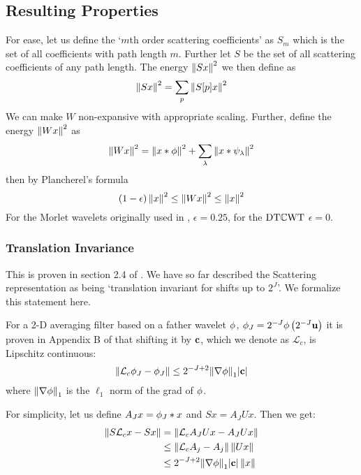 \subsection{Resulting Properties}
For ease, let us define the `$m$th order scattering coefficients' as $S_m$ which
is the set of all coefficients with path length $m$. Further let $S$ be the set
of all scattering coefficients of any path length. The energy $\left\lVert Sx \right\rVert^2$ we 
then define as
\begin{equation}
  \left\lVert Sx \right\rVert^2 = \sum_p \left\lVert S[p]x \right\rVert^2
\end{equation}
We can make $W$ non-expansive with appropriate scaling. Further, define the energy $\left\lVert Wx \right\rVert^2$ as
\begin{equation}
  \left\lVert Wx \right\rVert^2 = \left\lVert x\ast \phi \right\rVert^2 + \sum_\lambda \left\lVert x \ast
  \psi_\lambda \right\rVert^2 
\end{equation}
then by Plancherel's formula
\begin{equation}
  (1-\epsilon)\left\lVert x \right\rVert^2 \leq \left\lVert Wx \right\rVert^2 \leq \left\lVert x \right\rVert^2
\end{equation}
For the Morlet wavelets originally used in \cite{bruna_invariant_2013},
$\epsilon=0.25$, for the $\mathrm{DT}\mathbb{C}\mathrm{WT}$ $\epsilon = 0$.


\subsubsection{Translation Invariance}
\newcommand{\shift}{\mathcal{L}_c}

This is proven in section 2.4 of \cite{mallat_group_2012}. We
have so far described the Scattering representation as being `translation
invariant for shifts up to $2^J$'. We formalize this statement here.

For a 2-D averaging filter based on a father wavelet $\phi$, 
$\phi_J = 2^{-J}\phi\left(2^{-J}\mathbf{u}\right)$ it is proven in Appendix B of
\cite{mallat_group_2012} that shifting 
it by $\mathbf{c}$, which we denote as $\mathcal{L}_c$, is Lipschitz continuous:
\begin{equation}
  \norm{\shift \phi_J - \phi_J} \leq 2^{-J+2}\lnorm{\nabla \phitd}{1}|\bmu{c}|
\end{equation}
where ${\left\lVert \nabla \phi \right\rVert}_{1}$ is the $\ell_1$ norm of the grad of $\phi$.

For simplicity, let us define $A_J x = \phi_J \ast x$ and $Sx = A_J Ux$. Then we get:
\begin{align}
  \norm{S\shift x - Sx} & = \norm{\shift A_J Ux - A_J Ux} \\
                         &\leq \norm{\shift A_j - A_j}\norm{Ux} \\
                         & \leq 2^{-J+2}\lnorm{\nabla \phitd}{1}|\bmu{c}|\norm{x}
\end{align}

